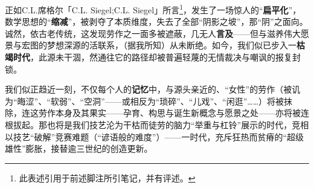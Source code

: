 正如C.L.席格尔「C.L. Siegel;C.L. Siegel」所言\footnote{此表述引用于前述脚注所引笔记，并有评述。}，发生了一场惊人的“\textbf{扁平化}”，数学思想的“\textbf{缩减}”，被剥夺了本质维度，失去了全部“阴影之坡”，那“阴”之面向。诚然，依古老传统，这发现劳作之一面多被遮蔽，几无人\textbf{言及}——但与滋养伟大愿景与宏图的梦想深源的活联系，（据我所知）从未断绝。如今，我们似已步入一\textbf{枯竭时代}，此源未干涸，然通往它的路径却被普遍轻蔑的无情裁决与嘲讽的报复封锁。

我们似正趋近一刻，不仅每个人的\textbf{记忆}中，与源头亲近的、“女性”的劳作（被讥为“晦涩”、“软弱”、“空洞”——或相反为“琐碎”、“儿戏”、“闲逛”……）将被抹除，连这劳作本身及其果实——孕育、构思与诞生新概念与愿景之处——亦将被连根拔起。那也将是我们技艺沦为干枯而徒劳的脑力“举重与杠铃”展示的时代，竞相以技艺“破解”竞赛难题（“谚语般的难度”）——一时代，充斥狂热而贫瘠的“超级雄性”膨胀，接替逾三世纪的创造更新。